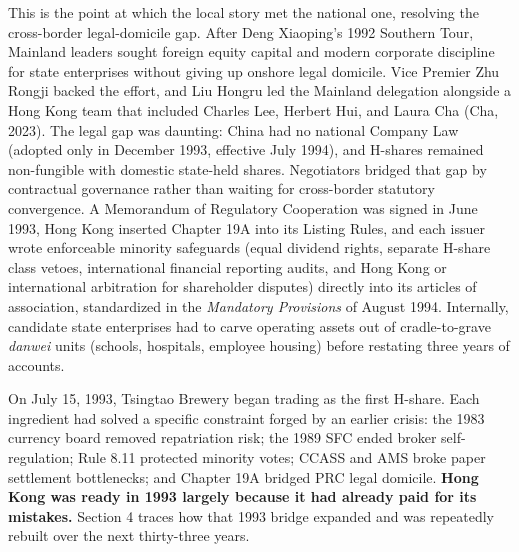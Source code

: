 \documentclass[11pt,letterpaper]{article}
\begin{document}
This is the point at which the local story met the national one, resolving the cross-border legal-domicile gap. After Deng Xiaoping's 1992 Southern Tour, Mainland leaders sought foreign equity capital and modern corporate discipline for state enterprises without giving up onshore legal domicile. Vice Premier Zhu Rongji backed the effort, and Liu Hongru led the Mainland delegation alongside a Hong Kong team that included Charles Lee, Herbert Hui, and Laura Cha (Cha, 2023). The legal gap was daunting: China had no national Company Law (adopted only in December 1993, effective July 1994), and H-shares remained non-fungible with domestic state-held shares. Negotiators bridged that gap by contractual governance rather than waiting for cross-border statutory convergence. A Memorandum of Regulatory Cooperation was signed in June 1993, Hong Kong inserted Chapter 19A into its Listing Rules, and each issuer wrote enforceable minority safeguards (equal dividend rights, separate H-share class vetoes, international financial reporting audits, and Hong Kong or international arbitration for shareholder disputes) directly into its articles of association, standardized in the \textit{Mandatory Provisions} of August 1994. Internally, candidate state enterprises had to carve operating assets out of cradle-to-grave \textit{danwei} units (schools, hospitals, employee housing) before restating three years of accounts.

On July 15, 1993, Tsingtao Brewery began trading as the first H-share. Each ingredient had solved a specific constraint forged by an earlier crisis: the 1983 currency board removed repatriation risk; the 1989 SFC ended broker self-regulation; Rule 8.11 protected minority votes; CCASS and AMS broke paper settlement bottlenecks; and Chapter 19A bridged PRC legal domicile. \textbf{Hong Kong was ready in 1993 largely because it had already paid for its mistakes.} Section 4 traces how that 1993 bridge expanded and was repeatedly rebuilt over the next thirty-three years.
\end{document}
